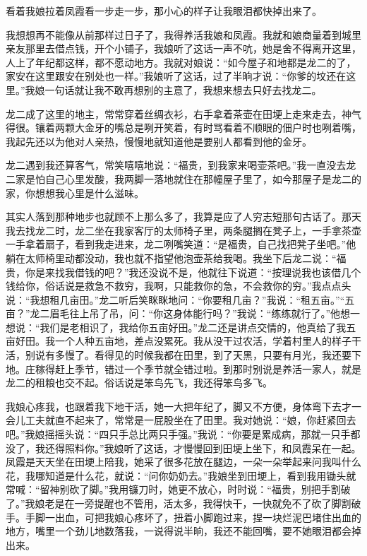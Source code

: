 \documentclass[12pt,UTF8]{ctexbook}
\begin{document}
看着我娘拉着凤霞看一步走一步，那小心的样子让我眼泪都快掉出来了。

我想想再不能像从前那样过日子了，我得养活我娘和凤霞。我就和娘商量着到城里亲友那里去借点钱，开个小铺子，我娘听了这话一声不吭，她是舍不得离开这里，人上了年纪都这样，都不愿动地方。我就对娘说：“如今屋子和地都是龙二的了，家安在这里跟安在别处也一样。”我娘听了这话，过了半晌才说：“你爹的坟还在这里。”我娘一句话就让我不敢再想别的主意了，我想来想去只好去找龙二。

龙二成了这里的地主，常常穿着丝绸衣衫，右手拿着茶壶在田埂上走来走去，神气得很。镶着两颗大金牙的嘴总是咧开笑着，有时骂看着不顺眼的佃户时也咧着嘴，我起先还以为他对人亲热，慢慢地就知道他是要别人都看到他的金牙。

龙二遇到我还算客气，常笑嘻嘻地说：“福贵，到我家来喝壶茶吧。”我一直没去龙二家是怕自己心里发酸，我两脚一落地就住在那幢屋子里了，如今那屋子是龙二的家，你想想我心里是什么滋味。

其实人落到那种地步也就顾不上那么多了，我算是应了人穷志短那句古话了。那天我去找龙二时，龙二坐在我家客厅的太师椅子里，两条腿搁在凳子上，一手拿茶壶一手拿着扇子，看到我走进来，龙二咧嘴笑道：“是福贵，自己找把凳子坐吧。”他躺在太师椅里动都没动，我也就不指望他泡壶茶给我喝。我坐下后龙二说：“福贵，你是来找我借钱的吧？”我还没说不是，他就往下说道：“按理说我也该借几个钱给你，俗话说是救急不救穷，我啊，只能救你的急，不会救你的穷。”我点点头说：“我想租几亩田。”龙二听后笑眯眯地问：“你要租几亩？”我说：“租五亩。”“五亩？”龙二眉毛往上吊了吊，问：“你这身体能行吗？”我说：“练练就行了。”他想一想说：“我们是老相识了，我给你五亩好田。”龙二还是讲点交情的，他真给了我五亩好田。我一个人种五亩地，差点没累死。我从没干过农活，学着村里人的样子干活，别说有多慢了。看得见的时候我都在田里，到了天黑，只要有月光，我还要下地。庄稼得赶上季节，错过一个季节就全错过啦。到那时别说是养活一家人，就是龙二的租粮也交不起。俗话说是笨鸟先飞，我还得笨鸟多飞。

我娘心疼我，也跟着我下地干活，她一大把年纪了，脚又不方便，身体弯下去才一会儿工夫就直不起来了，常常是一屁股坐在了田里。我对她说：“娘，你赶紧回去吧。”我娘摇摇头说：“四只手总比两只手强。”我说：“你要是累成病，那就一只手都没了，我还得照料你。”我娘听了这话，才慢慢回到田埂上坐下，和凤霞呆在一起。凤霞是天天坐在田埂上陪我，她采了很多花放在腿边，一朵一朵举起来问我叫什么花，我哪知道是什么花，就说：“问你奶奶去。”我娘坐到田埂上，看到我用锄头就常喊：“留神别砍了脚。”我用镰刀时，她更不放心，时时说：“福贵，别把手割破了。”我娘老是在一旁提醒也不管用，活太多，我得快干，一快就免不了砍了脚割破手。手脚一出血，可把我娘心疼坏了，扭着小脚跑过来，捏一块烂泥巴堵住出血的地方，嘴里一个劲儿地数落我，一说得说半晌，我还不能回嘴，要不她眼泪都会掉出来。
\end{document}
